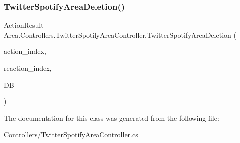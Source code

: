 \mbox{\label{classArea_1_1Controllers_1_1TwitterSpotifyAreaController_aff6aafc5961c78aae4b40218c8dea7fb}} 
\subsubsection{\texorpdfstring{Twitter\+Spotify\+Area\+Deletion()}{TwitterSpotifyAreaDeletion()}}
{\footnotesize\ttfamily Action\+Result Area.\+Controllers.\+Twitter\+Spotify\+Area\+Controller.\+Twitter\+Spotify\+Area\+Deletion (\begin{DoxyParamCaption}\item[{string}]{action\+\_\+index,  }\item[{string}]{reaction\+\_\+index,  }\item[{\mbox{[}\+From\+Services\mbox{]} \mbox{\hyperlink{classArea_1_1DAT_1_1AreaDbContext}{Area\+Db\+Context}}}]{DB }\end{DoxyParamCaption})\hspace{0.3cm}{\ttfamily [inline]}}



The documentation for this class was generated from the following file\+:\begin{DoxyCompactItemize}
\item 
Controllers/\mbox{\hyperlink{TwitterSpotifyAreaController_8cs}{Twitter\+Spotify\+Area\+Controller.\+cs}}\end{DoxyCompactItemize}
